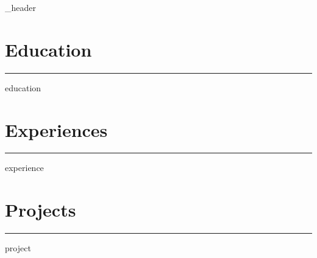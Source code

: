 \documentclass[letter,10pt]{article}
\author{Vyacheslav Guch}
\begin{document}
{_header}

\section{Education}
\noindent\rule{17cm}{0.1pt}
{education}

\section{Experiences}
\noindent\rule{17cm}{0.1pt}
{experience}

\section{Projects}
\noindent\rule{17cm}{0.1pt}
{project}

\end{document}
